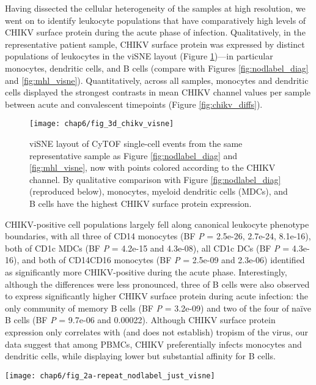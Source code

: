 Having dissected the cellular heterogeneity of the samples at high resolution, we went on to identify leukocyte populations that have comparatively high levels of CHIKV surface protein during the acute phase of infection. Qualitatively, in the representative patient sample, CHIKV surface protein was expressed by distinct populations of leukocytes in the viSNE layout (Figure \ref{fig:chikv_visne})—in particular monocytes, dendritic cells, and B cells (compare with Figures \ref{fig:nodlabel_diag} and \ref{fig:mhl_visne}). Quantitatively, across all samples, monocytes and dendritic cells displayed the strongest contrasts in mean CHIKV channel values per sample between acute and convalescent timepoints (Figure \ref{fig:chikv_diffs}).
\begin{figure}[htb]
  \centering
  \texttt{[image: chap6/fig\_3d\_chikv\_visne]}
  \caption[viSNE layout of CHIKV surface protein expression levels]{viSNE layout of CyTOF single-cell events from the same representative sample as Figure \ref{fig:nodlabel_diag} and \ref{fig:mhl_visne}, now with points colored according to the CHIKV channel. By qualitative comparison with Figure \ref{fig:nodlabel_diag} (reproduced below), monocytes, myeloid dendritic cells (MDCs), and B cells have the highest CHIKV surface protein expression. 
  }
  \label{fig:chikv_visne}
\end{figure}
CHIKV-positive cell populations largely fell along canonical leukocyte phenotype boundaries, with all three \subcommunities{} of CD14\sups{+} monocytes (BF \emph{P} = 2.5e-26, 2.7e-24, 8.1e-16), both \subcommunities{} of CD1c MDCs (BF \emph{P} = 4.2e-15 and 4.3e-08), all CD1c DCs (BF \emph{P} = 4.3e-16), and both \subcommunities{} of CD14\sups{+}\allowbreak CD16\sups{+} monocytes (BF \emph{P} = 2.5e-09 and 2.3e-06) identified as significantly more CHIKV-positive during the acute phase. Interestingly, although the differences were less pronounced, three \subcommunities{} of B cells were also observed to express significantly higher CHIKV surface protein during acute infection: the only community of memory B cells (BF \emph{P} = 3.2e-09) and two of the four \subcommunities{} of naïve B cells (BF \emph{P} = 9.7e-06 and 0.00022). Although CHIKV surface protein expression only correlates with (and does not establish) tropism of the virus, our data suggest that among PBMCs, CHIKV preferentially infects monocytes and dendritic cells, while displaying lower but substantial affinity for B cells.

\begin{marginfigure}[-17cm]
  \centering
  \texttt{[image: chap6/fig\_2a-repeat\_nodlabel\_just\_visne]}
\end{marginfigure}

